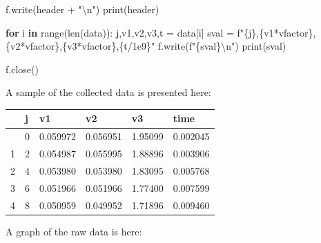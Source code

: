 \documentclass[
  letterpaper,
  DIV=11,
  numbers=noendperiod]{scrartcl}
\newenvironment{Shaded}{\begin{snugshade}}{\end{snugshade}}
\newcommand{\BuiltInTok}[1]{\textcolor[rgb]{0.00,0.23,0.31}{#1}}
\newcommand{\CharTok}[1]{\textcolor[rgb]{0.13,0.47,0.30}{#1}}
\newcommand{\ControlFlowTok}[1]{\textcolor[rgb]{0.00,0.23,0.31}{\textbf{#1}}}
\newcommand{\FloatTok}[1]{\textcolor[rgb]{0.68,0.00,0.00}{#1}}
\newcommand{\KeywordTok}[1]{\textcolor[rgb]{0.00,0.23,0.31}{\textbf{#1}}}
\newcommand{\NormalTok}[1]{\textcolor[rgb]{0.00,0.23,0.31}{#1}}
\newcommand{\OperatorTok}[1]{\textcolor[rgb]{0.37,0.37,0.37}{#1}}
\newcommand{\SpecialCharTok}[1]{\textcolor[rgb]{0.37,0.37,0.37}{#1}}
\newcommand{\SpecialStringTok}[1]{\textcolor[rgb]{0.13,0.47,0.30}{#1}}
\newcommand{\StringTok}[1]{\textcolor[rgb]{0.13,0.47,0.30}{#1}}
\begin{document}
\begin{Shaded}
\begin{Highlighting}[]
\NormalTok{f.write(header }\OperatorTok{+} \StringTok{"}\CharTok{\textbackslash{}n}\StringTok{"}\NormalTok{)}
\BuiltInTok{print}\NormalTok{(header)}

\ControlFlowTok{for}\NormalTok{ i }\KeywordTok{in} \BuiltInTok{range}\NormalTok{(}\BuiltInTok{len}\NormalTok{(data)):}
\NormalTok{    j,v1,v2,v3,t }\OperatorTok{=}\NormalTok{ data[i]}
\NormalTok{    sval }\OperatorTok{=} \SpecialStringTok{f"}\SpecialCharTok{\{}\NormalTok{j}\SpecialCharTok{\}}\SpecialStringTok{,}\SpecialCharTok{\{}\NormalTok{v1}\OperatorTok{*}\NormalTok{vfactor}\SpecialCharTok{\}}\SpecialStringTok{,}\SpecialCharTok{\{}\NormalTok{v2}\OperatorTok{*}\NormalTok{vfactor}\SpecialCharTok{\}}\SpecialStringTok{,}\SpecialCharTok{\{}\NormalTok{v3}\OperatorTok{*}\NormalTok{vfactor}\SpecialCharTok{\}}\SpecialStringTok{,}\SpecialCharTok{\{}\NormalTok{t}\OperatorTok{/}\FloatTok{1e9}\SpecialCharTok{\}}\SpecialStringTok{"}
\NormalTok{    f.write(}\SpecialStringTok{f"}\SpecialCharTok{\{}\NormalTok{sval}\SpecialCharTok{\}}\CharTok{\textbackslash{}n}\SpecialStringTok{"}\NormalTok{)}
    \BuiltInTok{print}\NormalTok{(sval)}
    
\NormalTok{f.close()}
\end{Highlighting}
\end{Shaded}

A sample of the collected data is presented here:

\begin{longtable}[]{@{}llllll@{}}
\toprule\noalign{}
& j & v1 & v2 & v3 & time \\
\midrule\noalign{}
\endhead
\bottomrule\noalign{}
\endlastfoot
0 & 0 & 0.059972 & 0.056951 & 1.95099 & 0.002045 \\
1 & 2 & 0.054987 & 0.055995 & 1.88896 & 0.003906 \\
2 & 4 & 0.053980 & 0.053980 & 1.83095 & 0.005768 \\
3 & 6 & 0.051966 & 0.051966 & 1.77400 & 0.007599 \\
4 & 8 & 0.050959 & 0.049952 & 1.71896 & 0.009460 \\
\end{longtable}

A graph of the raw data is here:
\end{document}
